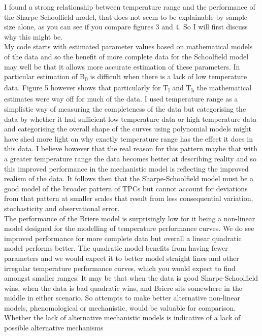 \documentclass[fontsize=11pt]{scrartcl}\usepackage[]{graphicx}\usepackage[]{color}
\begin{document}
  I found a strong relationship between temperature range and the performance of the Sharpe-Schoolfield model,
  that does not seem to be explainable by sample size alone, 
  as you can see if you compare figures 3 and 4. So I will first discuss why this might be. \\
  My code starts with estimated parameter values based on mathematical models of the data and 
  so the benefit of more complete data for the Schoolfield model may well be that it allows more 
  accurate estimation of these parameters. In particular estimation of B\textsubscript{0} is 
  difficult when there is a lack of low temperature data.  Figure 5 however shows that particularly for T\textsubscript{l} 
  and T\textsubscript{h} the mathematical estimates were way off for much of the data. I used temperature range as a simplistic way of measuring
  the completeness of the data but categorising the data by whether it had sufficient low temperature data or high temperature data 
  and categorising the overall shape of the curves using polynomial models might have shed more light on why exactly temperature 
  range has the effect it does in this data. I believe however that the real reason for this pattern maybe that with a greater temperature
  range the data becomes better at describing reality and so this improved performance in the mechanistic model is reflecting the
  improved realism of the data. It follows then that the Sharpe-Schoolfield model must be a good model of the broader pattern of 
  TPCs but cannot account for deviations from that pattern at smaller scales that result 
  from less consequential variation, stochasticity and observational error. \\
  The performance of the Briere model is surprisingly low for it being a non-linear model designed
  for the modelling of temperature performance curves. We do see improved performance for more complete data but overall 
  a linear quadratic model performs better. The quadratic model benefits from having fewer parameters and 
  we would expect it to better model straight lines and other irregular temperature performance curves, 
  which you would expect to find amongst smaller ranges. 
  It may be that when the data is good Sharpe-Schoolfield wins, when the data is bad quadratic wins, 
  and Briere sits somewhere in the middle in either scenario. So attempts to make better alternative non-linear models, 
  phenomological or mechanistic, would be valuable for comparison.\\
  Whether the lack of alternative mechanistic models is indicative of a lack of possible alternative mechanisms 
\end{document}
